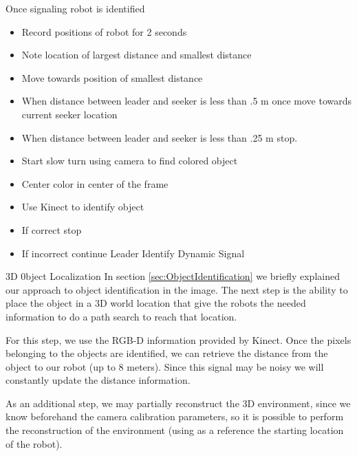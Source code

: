 \documentclass[conference]{IEEEtran}
\makeatletter
\renewcommand\subsection{\@startsection{subsection}{1}{\z@}
                                  {-2.0ex plus -1.5ex minus -0.5ex}
                                  {0.7ex plus 1ex minus 0ex}
                                  {\itshape\bfseries}}
\makeatother
\begin{document}
Once signaling robot is identified
\begin{itemize}
\item{Record positions of robot for 2 seconds}
\item{Note location of largest distance and smallest distance}
\item{Move towards position of smallest distance}
\item{When distance between leader and seeker is less than .5 m once move towards current seeker location}
\item{When distance between leader and seeker is less than .25 m stop.}
\item{Start slow turn using camera to find colored object}
\item{Center color in center of the frame}
\item{Use Kinect to identify object}
\item{If correct stop}
\item{If incorrect continue Leader Identify Dynamic Signal}
\end{itemize}

\subsection{3D 0bject Localization}
\label{sec:Localization}
In section \ref{sec:ObjectIdentification} we
briefly explained our approach to object identification in
the image. The next step is the ability to place the
object in a 3D world location that give the robots the needed
information to do a path search to reach that location.

For this step, we use the RGB-D information provided by Kinect.
Once the pixels belonging to the objects are identified, we can
retrieve the distance from the object to our robot (up to 8 meters).
Since this signal may be noisy we will constantly update the distance
information. 

As an additional step, we may partially reconstruct the 3D environment,
since we know beforehand the camera calibration parameters, so it is possible
to perform the reconstruction of the environment (using as a reference the 
starting location of the robot).
\end{document}

